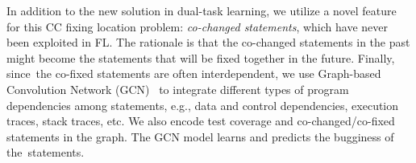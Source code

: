 
In addition to the new solution in dual-task learning, we utilize a
novel feature for this CC fixing location problem: {\em co-changed
statements}, which have never been exploited in FL. The rationale is
that the co-changed statements in the past might become the statements
that will be fixed together in the future. Finally, since~the co-fixed
statements are often interdependent, we use Graph-based Convolution
Network (GCN)~\cite{li2019gcn} to integrate different types of program
dependencies among statements, e.g., data and control dependencies,
execution traces, stack traces, etc. We also encode test coverage and
co-changed/co-fixed statements in the graph. The GCN model learns and
predicts the bugginess of the~statements.



